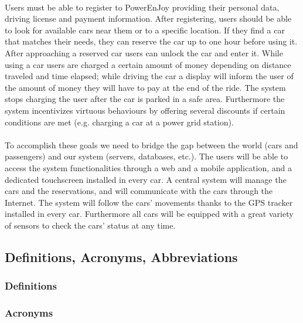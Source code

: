 \documentclass[english]{article}
\begin{document}
\paragraph{}
Users must be able to register to PowerEnJoy providing their personal data, driving license and payment information.
After registering, users should be able to look for available cars near them or to a specific location. If they find a car that matches their needs, they can reserve the car up to one hour before using it. After approaching a reserved car users can unlock the car and enter it. 
While using a car users are charged a certain amount of money depending on distance traveled and time elapsed; while driving the car a display will inform the user of the amount of money they will have to pay at the end of the ride.
The system stops charging the user after the car is parked in a safe area.
Furthermore the system incentivizes virtuous behaviours by offering several discounts if certain conditions are met (e.g. charging a car at a power grid station).

\paragraph{}
To accomplish these goals we need to bridge the gap between the world (cars and passengers) and our system (servers, databases, etc.).
The users will be able to access the system functionalities through a web and a mobile application, and a dedicated touchscreen installed in every car.
A central system will manage the cars and the reservations, and will communicate with the cars through the Internet. The system will follow the cars’ movements thanks to the GPS tracker installed in every car. Furthermore all cars will be equipped with a great variety of sensors to check the cars’ status at any time.


\subsection{Definitions, Acronyms, Abbreviations}

\subsubsection{Definitions}

\subsubsection{Acronyms}
\end{document}
